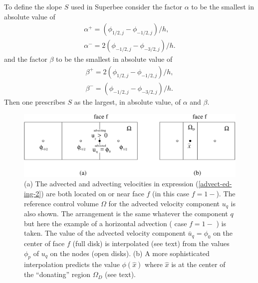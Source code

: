To define the slope $S$ used in Superbee consider the factor $\alpha$ to be
the smallest in absolute value of
\begin{eqnarray}
\alpha^+=(\phi_{1/2,j} -\phi_{-1/2,j})/ h ,  \nonumber \\
\alpha^-=2 (\phi_{-1/2,j} -\phi_{-3/2,j})/ h . 
\end{eqnarray}
and the factor $\beta$ to be the smallest in absolute value of 
\begin{eqnarray}
\beta^+=2 (\phi_{1/2,j} -\phi_{-1/2,j})/ h ,  \nonumber \\
\beta^-=(\phi_{-1/2,j} -\phi_{-3/2,j})/ h . 
\end{eqnarray}
Then one prescribes $S$ as the largest, in absolute value, of $\alpha$ and  $\beta$.
\begin{figure}
\begin{center}
    \includegraphics[width=\textwidth]{Figures/advect-ed-ing.pdf}
\end{center}
\caption{(a) The advected and advecting velocities in expression (\ref{advect-ed-ing-2}) 
  are both located on or near face $f$ (in this case $f=1-$). The reference control volume
$\Omega$ for the advected velocity component $u_q$ is also shown. The arrangement is the same
whatever the component $q$ but here the example of a horizontal advection ( case $f=1-$ ) is taken. 
The value of the advected velocity component $\bar u_q = \phi_0$ on the center of 
face $f$ (full disk) is interpolated (see text) from the values $\phi_{p}$ of $u_{q}$ on the nodes (open disks). 
(b) A more sophisticated interpolation predicts the value $\phi(\hat x)$ where $\hat x$ is
at the center of the ``donating'' region $\Omega_D$ (see text).}
\label{advect-ed-ing-fig}
\end{figure}
\label{tunedinter}

